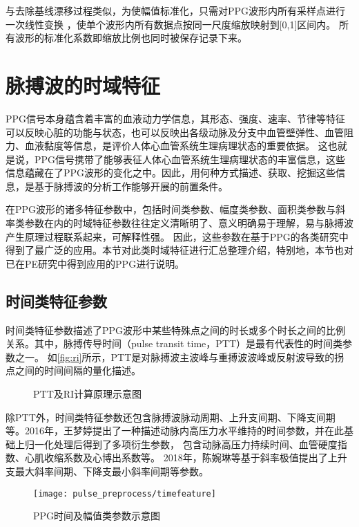 与去除基线漂移过程类似，为使幅值标准化，只需对PPG波形内所有采样点进行一次线性变换
，使单个波形内所有数据点按同一尺度缩放映射到[0,1]区间内。
所有波形的标准化系数即缩放比例也同时被保存记录下来。

\section{脉搏波的时域特征}
PPG信号本身蕴含着丰富的血液动力学信息，其形态、强度、速率、节律等特征可以反映心脏的功能与状态，也可以反映出各级动脉及分支中血管壁弹性、血管阻力、血液黏度等信息，是评价人体心血管系统生理病理状态的重要依据\cite{PPGYY}。
这也就是说，PPG信号携带了能够表征人体心血管系统生理病理状态的丰富信息，这些信息蕴藏在了PPG波形的变化之中。因此，用何种方式描述、获取、挖掘这些信息，是基于脉搏波的分析工作能够开展的前置条件。

在PPG波形的诸多特征参数中，包括时间类参数、幅度类参数、面积类参数与斜率类参数在内的时域特征参数往往定义清晰明了、意义明确易于理解，易与脉搏波产生原理过程联系起来，可解释性强。
因此，这些参数在基于PPG的各类研究中得到了最广泛的应用\cite{Chen2019,mmt}。本节对此类时域特征进行汇总整理介绍，特别地，本节也对已在PE研究中得到应用的PPG进行说明。

\subsection{时间类特征参数}
时间类特征参数描述了PPG波形中某些特殊点之间的时长或多个时长之间的比例关系。其中，脉搏传导时间（pulse transit time，PTT）是最有代表性的时间类参数之一\cite{Brumfield2005,Su2014}。
如\autoref{fig:ri}所示，PTT是对脉搏波主波峰与重搏波波峰或反射波导致的拐点之间的时间间隔的量化描述。
\begin{figure}[htbp]
    \centering
    \quad
    \caption[PTT及RI计算原理示意图]{\label{fig:ri}PTT及RI计算原理示意图\cite{Su2014}}
\end{figure}

除PTT外，时间类特征参数还包含脉搏波脉动周期、上升支间期、下降支间期等。2016年，王梦婷\cite{mmt}提出了一种描述动脉内高压力水平维持的时间参数，并在此基础上归一化处理后得到了多项衍生参数，
包含动脉高压力持续时间、血管硬度指数、心肌收缩系数及心博出系数等。
2018年，陈婉琳等\cite{Chen2019}基于斜率极值提出了上升支最大斜率间期、下降支最小斜率间期等参数。
\begin{figure}[htbp]
    \centering
    \texttt{[image: pulse\_preprocess/timefeature]}
    \caption[常见的PPG时间及幅值类参数示意图]{\label{fig:timefeature}PPG时间及幅值类参数示意图}
\end{figure}

